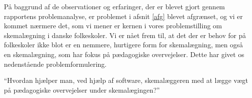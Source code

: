 På baggrund af de observationer og erfaringer, der er blevet gjort gennem rapportens problemanalyse, er problemet i afsnit \ref{afg} blevet afgrænset, og vi er kommet nærmere det, som vi mener er kernen i vores problemstilling om skemalægning i danske folkeskoler. Vi er nået frem til, at det der er behov for på folkeskoler ikke blot er en nemmere, hurtigere form for skemalægning, men også en skemalægning, som har fokus på pædagogiske overvejelser. Dette har givet os nedenstående problemformulering.

``Hvordan hjælper man, ved hjælp af software, skemalæggeren med at lægge vægt på pædagogiske overvejelser under skemalægingen?''